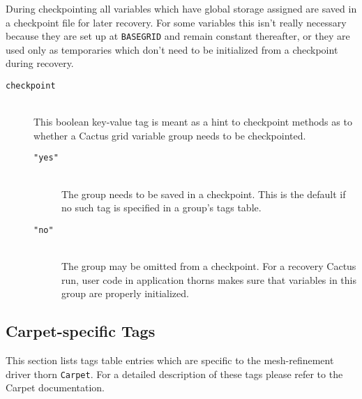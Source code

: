 During checkpointing all variables which have global storage assigned are saved
in a checkpoint file for later recovery. For some variables this isn't really
necessary because they are set up at \verb|BASEGRID| and remain constant
thereafter, or they are used only as temporaries which don't need to be
initialized from a checkpoint during recovery.

\begin{description}
\item[\texttt{checkpoint}]\mbox{}\\
  This boolean key-value tag is meant as a hint to checkpoint methods
  as to whether a Cactus grid variable group needs to be checkpointed.
  \begin{description}
    \item[\texttt{"yes"}]\mbox{}\\
      The group needs to be saved in a checkpoint.
      This is the default if no such tag is specified in a group's tags table.
    \item[\texttt{"no"}]\mbox{}\\
      The group may be omitted from a checkpoint. For a recovery Cactus run,
      user code in application thorns makes sure that variables in this group
      are properly initialized.
  \end{description}
\end{description}


\subsection{Carpet-specific Tags}

This section lists tags table entries which are specific to the mesh-refinement
driver thorn {\tt Carpet}. For a detailed description of these tags please
refer to the Carpet documentation.

